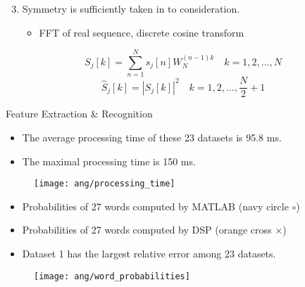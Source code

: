 \begin{frame}
\begin{enumerate}
	\setcounter{enumi}{2}
	\item Symmetry is sufficiently taken in to consideration.
	\begin{itemize}
		\item FFT of real sequence, discrete cosine transform
	\end{itemize}
\end{enumerate}

\begin{equation}
S_j[k] = \sum_{n=1}^{N} s_j[n] W_N^{(n-1) k} \quad k = 1, 2, \dots, N
\end{equation}
\begin{equation}
\hat{S}_j[k] = |S_j[k]|^2 \quad k = 1, 2, \dots, \frac{N}{2} + 1
\end{equation}
\end{frame}


\begin{frame}
Feature Extraction \& Recognition
\begin{itemize}
\item The average processing time of these 23 datasets is 95.8 ms.
\item The maximal processing time is 150 ms.
\end{itemize}

\begin{figure}[H]
\centering
\texttt{[image: ang/processing\_time]}
\end{figure}
\end{frame}


\begin{frame}
\begin{itemize}
\item Probabilities of 27 words computed by MATLAB (\textcolor{navy_matlab}{navy circle $\circ$})
\item Probabilities of 27 words computed by DSP (\textcolor{orange_matlab}{orange cross $\times$})
\item Dataset 1 has the largest relative error among 23 datasets.
\end{itemize}

\begin{figure}[H]
\centering
\texttt{[image: ang/word\_probabilities]}
\end{figure}
\end{frame}

